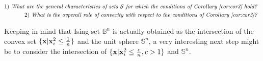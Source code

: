 \documentclass[10pt]{article}
\def\x{{\bf x}}
\def\x{{\mathbf x}}
\def\x{{\bf x}}
\def\x{{\bf x}}
\def\mS{{\mathbb S}}
\def\mB{{\mathbb B}}
\def\x{{\bf x}}
\def\x{{\mathbf x}}
\def\x{{\bf x}}
\def\x{{\bf x}}
\def\cS{{\mathcal S}}
\begin{document}
\vspace{-.0in}\begin{center}
 \begin{tcolorbox}[title= Two interesting questions: ]
\vspace{-.15in}
 \begin{eqnarray*}
& &  \hspace{-.2in} \mbox{ 1) \emph{What are the general characteristics of sets $\cS$ for which the conditions of Corollary \ref{cor:cor3} hold?  }}
\\
& & \hspace{-.2in} \mbox{ 2) \emph{What is the ovperall role of convexity with respect to the conditions of Corollary \ref{cor:cor3}? }}
  \end{eqnarray*}
\vspace{-.2in}
 \end{tcolorbox}
\end{center}\vspace{-.0in}


\noindent Keeping in mind that Ising set $\mB^n$ is actually obtained as the intersection of the convex set $\{\x|\x_i^2\leq\frac{1}{n}\}$  and the unit sphere $\mS^n$, a very interesting next step might be to consider the intersection of $\{\x|\x_i^2\leq\frac{c}{n},c>1\}$ and $\mS^n$.



\begin{singlespace}


\end{singlespace}
\end{document}
